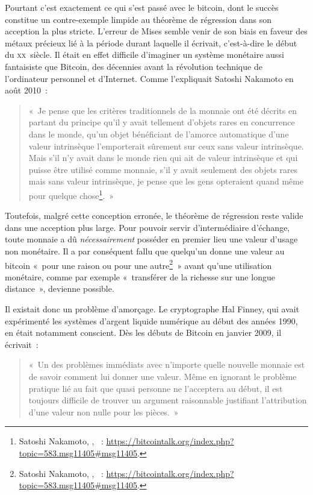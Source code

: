 Pourtant c'est exactement ce qui s'est passé avec le bitcoin, dont le succès constitue un contre-exemple limpide au théorème de régression dans son acception la plus stricte. L'erreur de Mises semble venir de son biais en faveur des métaux précieux lié à la période durant laquelle il écrivait, c'est-à-dire le début du \textsc{xx}\ieme{}~siècle. Il était en effet difficile d'imaginer un système monétaire aussi fantaisiste que Bitcoin, des décennies avant la révolution technique de l'ordinateur personnel et d'Internet. Comme l'expliquait Satoshi Nakamoto en août 2010~:

\begin{quote}
«~Je pense que les critères traditionnels de la monnaie ont été décrits en partant du principe qu'il y avait tellement d'objets rares en concurrence dans le monde, qu'un objet bénéficiant de l'amorce automatique d'une valeur intrinsèque l'emporterait sûrement sur ceux sans valeur intrinsèque. Mais s'il n'y avait dans le monde rien qui ait de valeur intrinsèque et qui puisse être utilisé comme monnaie, s'il y avait seulement des objets rares mais sans valeur intrinsèque, je pense que les gens opteraient quand même pour quelque chose\footnote{Satoshi Nakamoto, , ~: \url{https://bitcointalk.org/index.php?topic=583.msg11405\#msg11405}.}.~»
\end{quote} 

Toutefois, malgré cette conception erronée, le théorème de régression reste valide dans une acception plus large. Pour pouvoir servir d'intermédiaire d'échange, toute monnaie a dû \emph{nécessairement} posséder en premier lieu une valeur d'usage non monétaire. Il a par conséquent fallu que quelqu'un donne une valeur au bitcoin «~pour une raison ou pour une autre\footnote{Satoshi Nakamoto, , ~: \url{https://bitcointalk.org/index.php?topic=583.msg11405\#msg11405}.}~» avant qu'une utilisation monétaire, comme par exemple «~transférer de la richesse sur une longue distance~», devienne possible.

Il existait donc un problème d'amorçage. Le cryptographe Hal Finney, qui avait expérimenté les systèmes d'argent liquide numérique au début des années 1990, en était notamment conscient. Dès les débuts de Bitcoin en janvier 2009, il écrivait~: 

\begin{quote}
«~Un des problèmes immédiats avec n'importe quelle nouvelle monnaie est de savoir comment lui donner une valeur. Même en ignorant le problème pratique lié au fait que quasi personne ne l'acceptera au début, il est toujours difficile de trouver un argument raisonnable justifiant l'attribution d'une valeur non nulle pour les pièces.~»
\end{quote}

